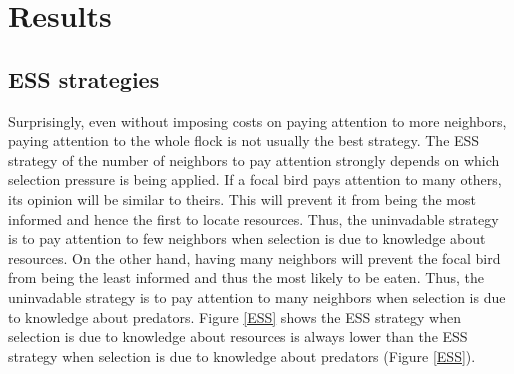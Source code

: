 \documentclass{article}
\begin{document}
\section{Results }

\subsection{ESS strategies }
Surprisingly, even without imposing costs on paying attention to more neighbors, paying attention to the whole flock is not usually the best strategy. The ESS strategy of the number of neighbors to pay attention strongly depends on which selection pressure is being applied.  If a focal bird pays attention to many others, its opinion will be similar to theirs. This will prevent it from being the most informed and hence the first to locate resources. Thus, the uninvadable strategy is to pay attention to few neighbors when selection is due to knowledge about resources. On the other hand, having many neighbors will prevent the focal bird from being the least informed and thus the most likely to be eaten.  Thus, the uninvadable strategy is to pay attention to many neighbors when selection is due to knowledge about predators. Figure \ref{ESS} shows the ESS strategy when selection is due to knowledge about resources is always lower than the ESS strategy when selection is due to knowledge about predators (Figure \ref{ESS}).
\end{document}
